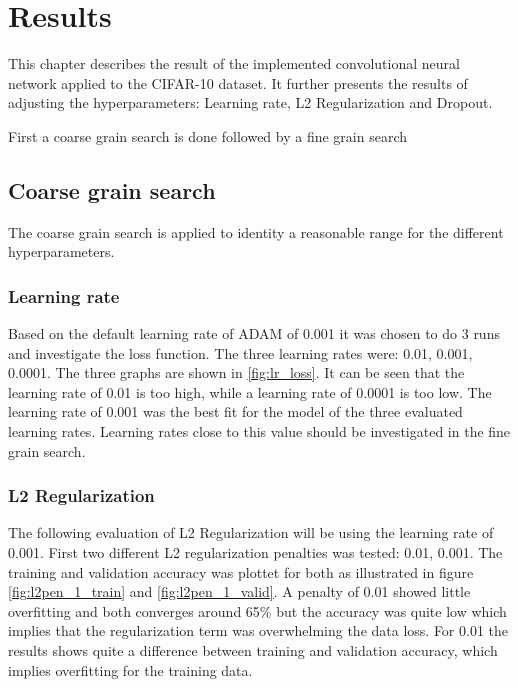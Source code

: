 \chapter{Results}
\label{chp:res}

This chapter describes the result of the implemented convolutional neural network applied to the CIFAR-10 dataset. It further presents the results of adjusting the hyperparameters: Learning rate, L2 Regularization and Dropout.

First a coarse grain search is done followed by a fine grain search

\section{Coarse grain  search}
The coarse grain search is applied to identity a reasonable range for the different hyperparameters.

\subsection{Learning rate}
Based on the default learning rate of ADAM of 0.001 it was chosen to do 3 runs and investigate the loss function. The three learning rates were: 0.01, 0.001, 0.0001. The three graphs are shown in \ref{fig:lr_loss}. It can be seen that the learning rate of 0.01 is too high, while a learning rate of 0.0001 is too low. The learning rate of 0.001 was the best fit for the model of the three evaluated learning rates. Learning rates close to this value should be investigated in the fine grain search.
	

\FloatBarrier
\subsection{L2 Regularization}
The following evaluation of L2 Regularization will be using the learning rate of 0.001. First two different L2 regularization penalties was tested: 0.01, 0.001.  The training and validation accuracy was plottet for both as illustrated in figure \ref{fig:l2pen_1_train} and \ref{fig:l2pen_1_valid}. A penalty of 0.01 showed little overfitting and both converges around 65\% but the accuracy was quite low which implies that the regularization term was overwhelming the data loss. For 0.01 the results shows quite a difference between training and validation accuracy, which implies overfitting for the training data. 

